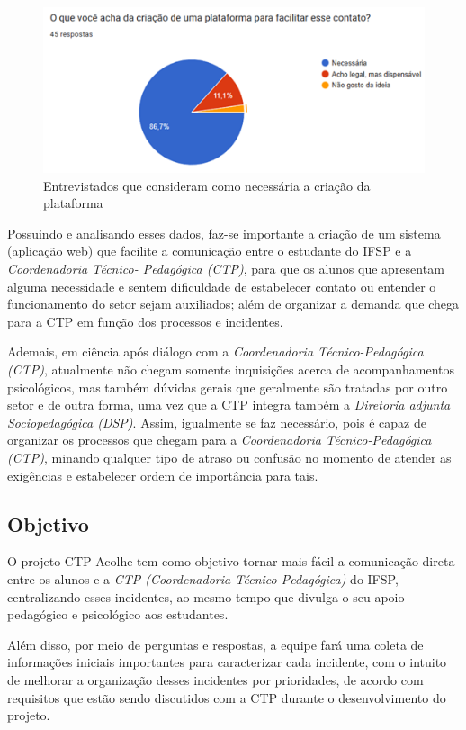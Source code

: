 \documentclass[12pt,a4paper]{article}
\begin{document}
\begin{figure}[H]
    \centering
     \includegraphics[width=15cm]{img4.png}
    \caption{Entrevistados que consideram como necessária a criação da plataforma}
    \label{fig04}
\end{figure}

Possuindo e analisando esses dados, faz-se importante a criação de um sistema (aplicação web) que facilite a comunicação entre o estudante do IFSP e a \textit{Coordenadoria Técnico- Pedagógica (CTP)}, para que os alunos que apresentam alguma necessidade e sentem dificuldade de estabelecer contato ou entender o funcionamento do setor sejam auxiliados; além de organizar a demanda que chega para a CTP em função dos processos e incidentes.

 Ademais, em ciência após diálogo com a \textit{Coordenadoria Técnico-Pedagógica (CTP)}, atualmente não chegam somente inquisições acerca de acompanhamentos psicológicos, mas também dúvidas gerais que geralmente são tratadas por outro setor e de outra forma, uma vez que a CTP integra também a \textit{Diretoria adjunta Sociopedagógica (DSP)}. Assim, igualmente se faz necessário, pois é capaz de organizar os processos que chegam para a \textit{Coordenadoria Técnico-Pedagógica (CTP)}, minando qualquer tipo de atraso ou confusão no momento de atender as exigências e estabelecer ordem de importância para tais. 

\subsection{Objetivo}

O projeto CTP Acolhe tem como objetivo tornar mais fácil a comunicação direta entre os alunos e a \textit{
CTP (Coordenadoria Técnico-Pedagógica)} do IFSP, centralizando esses incidentes, ao mesmo tempo que divulga o seu apoio pedagógico e psicológico aos estudantes. 

Além disso, por meio de perguntas e respostas, a equipe fará uma coleta de informações iniciais importantes para caracterizar cada incidente, com o intuito de melhorar a organização desses incidentes por prioridades, de acordo com requisitos que estão sendo discutidos com a CTP durante o desenvolvimento do projeto. 
\end{document}
